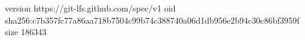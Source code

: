 version https://git-lfs.github.com/spec/v1
oid sha256:c7b357fc77a86aa718b7504c99b74c388740a06d1db956e2b94c30c86bf3959f
size 186343
